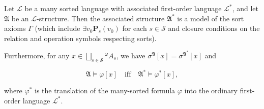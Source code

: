 Let $\mathcal{L}$ be a many sorted language with associated first-order language $\mathcal{L}^*$, and let $\mathfrak{A}$ be an $\mathcal{L}$-structure. Then the associated structure $\mathfrak{A}^*$ is a model of the sort axioms $\Gamma$ (which include $\exists v_0 \mathbf{P}_s(v_0)$ for each $s \in \mathcal{S}$ and closure conditions on the relation and operation symbols respecting sorts).

Furthermore, for any $x \in \bigsqcup_{s \in \mathcal{S}} {^\omega A_s}$, we have $\sigma^{\mathfrak{A}}[x] = \sigma^{\mathfrak{A}^*}[x]$ and

$$\mathfrak{A} \models \varphi[x] \quad \text{iff} \quad \mathfrak{A}^* \models \varphi^*[x],$$

where $\varphi^*$ is the translation of the many-sorted formula $\varphi$ into the ordinary first-order language $\mathcal{L}^*$.
